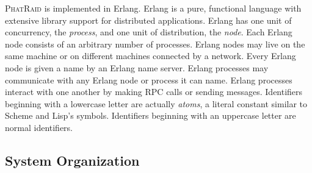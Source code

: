 \documentclass[10pt,letter]{article}
\newcommand{\phatraid}[0]{\textsc{PhatRaid}}
\begin{document}
\phatraid{} is implemented in Erlang. Erlang is a pure, functional language with
extensive library support for distributed applications. Erlang has one unit of
concurrency, the \emph{process}, and one unit of distribution, the
\emph{node}. Each Erlang node consists of an arbitrary number of
processes. Erlang nodes may live on the same machine or on different machines
connected by a network. Every Erlang node is given a name by an Erlang name
server. Erlang processes may communicate with any Erlang node or process it can
name. Erlang processes interact with one another by making RPC calls or sending
messages. Identifiers beginning with a lowercase letter are actually
\emph{atoms}, a literal constant similar to
Scheme and Lisp's symbols. Identifiers beginning with an uppercase letter are
normal identifiers.

\subsection{System Organization}
\end{document}
